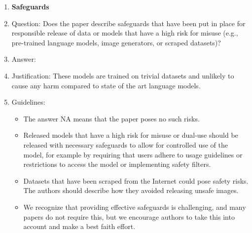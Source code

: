 \documentclass{article} %
\begin{document}
{\begin{appendices}
\begin{enumerate}
\item {\bf Safeguards}
    \item[] Question: Does the paper describe safeguards that have been put in place for responsible release of data or models that have a high risk for misuse (e.g., pre-trained language models, image generators, or scraped datasets)?
    \item[] Answer: \answerYes{} %
    \item[] Justification: These models are trained on trivial datasets and unlikely to cause any harm compared to state of the art language models.
    \item[] Guidelines:
    \begin{itemize}
        \item The answer NA means that the paper poses no such risks.
        \item Released models that have a high risk for misuse or dual-use should be released with necessary safeguards to allow for controlled use of the model, for example by requiring that users adhere to usage guidelines or restrictions to access the model or implementing safety filters. 
        \item Datasets that have been scraped from the Internet could pose safety risks. The authors should describe how they avoided releasing unsafe images.
        \item We recognize that providing effective safeguards is challenging, and many papers do not require this, but we encourage authors to take this into account and make a best faith effort.
    \end{itemize}


\end{enumerate}
\end{appendices}}
\end{document}
